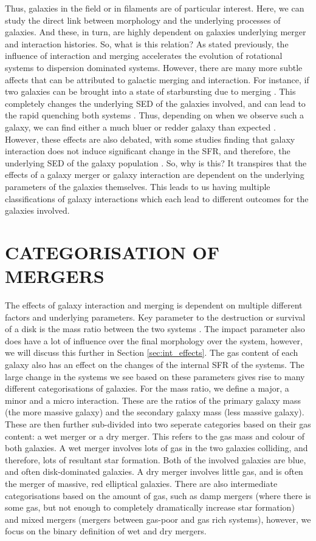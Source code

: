Thus, galaxies in the field or in filaments are of particular interest. Here, we can study the direct link between morphology and the underlying processes of galaxies. And these, in turn, are highly dependent on galaxies underlying merger and interaction histories. So, what is this relation? As stated previously, the influence of interaction and merging accelerates the evolution of rotational systems to dispersion dominated systems. However, there are many more subtle affects that can be attributed to galactic merging and interaction. For instance, if two galaxies can be brought into a state of starbursting due to merging \citep{2008MNRAS.385L..38M}. This completely changes the underlying SED of the galaxies involved, and can lead to the rapid quenching both systems \citep{2018MNRAS.476.2591V, 2022MNRAS.517L..92E}. Thus, depending on when we observe such a galaxy, we can find either a much bluer or redder galaxy than expected \citep{2007A&A...468...61D}. However, these effects are also debated, with some studies finding that galaxy interaction does not induce significant change in the SFR, and therefore, the underlying SED of the galaxy population \citep{2003A&A...405...31B}. So, why is this? It transpires that the effects of a galaxy merger or galaxy interaction are dependent on the underlying parameters of the galaxies themselves. This leads to us having multiple classifications of galaxy interactions which each lead to different outcomes for the galaxies involved. 

\section{CATEGORISATION OF MERGERS}
\noindent The effects of galaxy interaction and merging is dependent on multiple different factors and underlying parameters. Key parameter to the destruction or survival of a disk is the mass ratio between the two systems \citep{2008MNRAS.384..386C}. The impact parameter also does have a lot of influence over the final morphology over the system, however, we will discuss this further in Section \ref{sec:int_effects}. The gas content of each galaxy also has an effect on the changes of the internal SFR of the systems. The large change in the systems we see based on these parameters gives rise to many different categorisations of galaxies. For the mass ratio, we define a major, a minor and a micro interaction. These are the ratios of the primary galaxy mass (the more massive galaxy) and the secondary galaxy mass (less massive galaxy). These are then further sub-divided into two seperate categories based on their gas content: a wet merger or a dry merger. This refers to the gas mass and colour of both galaxies. A wet merger involves lots of gas in the two galaxies colliding, and therefore, lots of resultant star formation. Both of the involved galaxies are blue, and often disk-dominated galaxies. A dry merger involves little gas, and is often the merger of massive, red elliptical galaxies. There are also intermediate categorisations based on the amount of gas, such as damp mergers (where there is some gas, but not enough to completely dramatically increase star formation) and mixed mergers (mergers between gas-poor and gas rich systems), however, we focus on the binary definition of wet and dry mergers.

